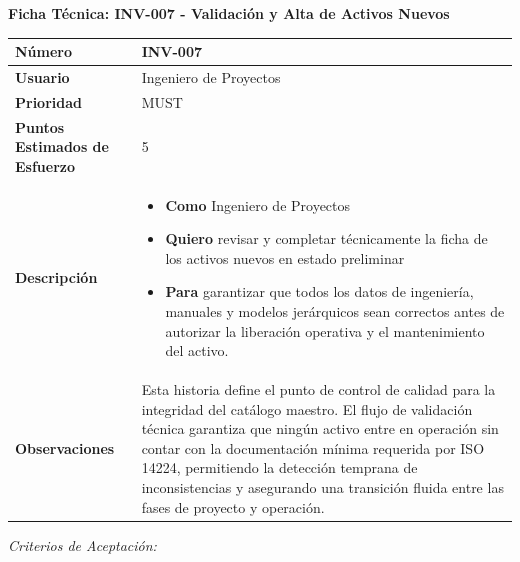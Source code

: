 \vspace{1em}
\noindent\textbf{Ficha Técnica: INV-007 - Validación y Alta de Activos Nuevos}
\footnotesize\setlength{\tabcolsep}{4pt}\renewcommand{\arraystretch}{1.2}
\begin{longtable}{|p{0.21\textwidth}|p{0.74\textwidth}|}\hline
\textbf{Número} & INV-007 \\ \hline
\textbf{Usuario} & Ingeniero de Proyectos \\ \hline
\textbf{Prioridad} & MUST \\ \hline
\textbf{Puntos Estimados de Esfuerzo} & 5 \\ \hline
\textbf{Descripción} & \parbox[t]{\linewidth}{\vspace{2pt}\begin{itemize}[leftmargin=1.5em, nosep, topsep=0pt]
\item \textbf{Como} Ingeniero de Proyectos
\item \textbf{Quiero} revisar y completar técnicamente la ficha de los activos nuevos en estado preliminar
\item \textbf{Para} garantizar que todos los datos de ingeniería, manuales y modelos jerárquicos sean correctos antes de autorizar la liberación operativa y el mantenimiento del activo.
\end{itemize}\vspace{2pt}} \\ \hline
\textbf{Observaciones} & Esta historia define el punto de control de calidad para la integridad del catálogo maestro. El flujo de validación técnica garantiza que ningún activo entre en operación sin contar con la documentación mínima requerida por ISO 14224, permitiendo la detección temprana de inconsistencias y asegurando una transición fluida entre las fases de proyecto y operación. \\ \hline
\end{longtable}\normalsize
\noindent\textit{Criterios de Aceptación:}
